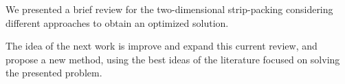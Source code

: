 We presented  a brief review for the two-dimensional strip-packing
considering different approaches to obtain an optimized solution.

The idea of the next work is improve and expand this current review,
and propose a new method, using the best ideas of the literature
focused on solving the presented problem.

